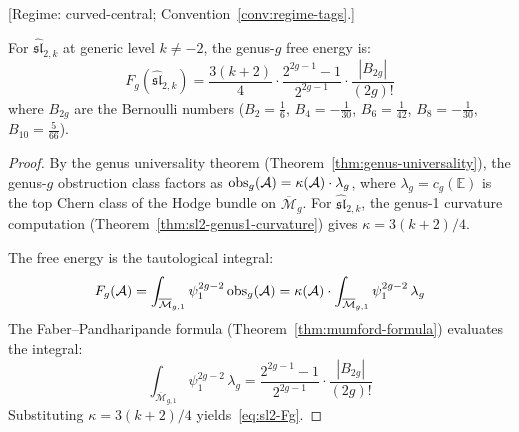 \begin{theorem}\label{thm:sl2-all-genera}
\textup{[Regime: curved-central\textup{;}
Convention~\textup{\ref{conv:regime-tags}}.]}

For $\widehat{\mathfrak{sl}}_{2,k}$ at generic level $k \neq -2$, the genus-$g$ free energy is:
\begin{equation}\label{eq:sl2-Fg}
F_g(\widehat{\mathfrak{sl}}_{2,k}) = \frac{3(k+2)}{4} \cdot \frac{2^{2g-1}-1}{2^{2g-1}} \cdot \frac{|B_{2g}|}{(2g)!}
\end{equation}
where $B_{2g}$ are the Bernoulli numbers ($B_2 = \frac{1}{6}$, $B_4 = -\frac{1}{30}$, $B_6 = \frac{1}{42}$, $B_8 = -\frac{1}{30}$, $B_{10} = \frac{5}{66}$).
\end{theorem}

\begin{proof}
By the genus universality theorem (Theorem~\ref{thm:genus-universality}), the genus-$g$ obstruction class factors as $\mathrm{obs}_g(\mathcal{A}) = \kappa(\mathcal{A}) \cdot \lambda_g$, where $\lambda_g = c_g(\mathbb{E})$ is the top Chern class of the Hodge bundle on $\overline{\mathcal{M}}_g$.  For $\widehat{\mathfrak{sl}}_{2,k}$, the genus-1 curvature computation (Theorem~\ref{thm:sl2-genus1-curvature}) gives $\kappa = 3(k+2)/4$.

The free energy is the tautological integral:
\[
F_g(\mathcal{A}) = \int_{\overline{\mathcal{M}}_{g,1}} \psi_1^{2g-2}\, \mathrm{obs}_g(\mathcal{A}) = \kappa(\mathcal{A}) \cdot \int_{\overline{\mathcal{M}}_{g,1}} \psi_1^{2g-2}\, \lambda_g
\]
The Faber--Pandharipande formula (Theorem~\ref{thm:mumford-formula}) evaluates the integral:
\[
\int_{\overline{\mathcal{M}}_{g,1}} \psi_1^{2g-2}\, \lambda_g = \frac{2^{2g-1}-1}{2^{2g-1}} \cdot \frac{|B_{2g}|}{(2g)!}
\]
Substituting $\kappa = 3(k+2)/4$ yields~\eqref{eq:sl2-Fg}.
\end{proof}

